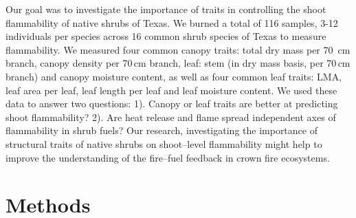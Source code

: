 \documentclass{bmcart}
\begin{document}
Our goal was to investigate the importance of traits in controlling the shoot flammability of native shrubs of Texas. 
We burned a total of 116 samples, 3-12 individuals per species across 16 common shrub species of Texas to measure flammability. We measured four common canopy traits: total dry mass per 70 \,cm branch, canopy density per 70\,cm branch,  leaf: stem (in dry mass basis, per 70\,cm branch) and canopy moisture content, as well as four common leaf traits: LMA, leaf area per leaf, leaf length per leaf and leaf moisture content. We used these data to answer two questions: 1). Canopy or leaf traits are better at predicting shoot flammability? 2). Are heat release and flame spread independent axes of flammability in shrub fuels? Our research, investigating the importance of structural traits of native shrubs on shoot--level flammability might help to improve the understanding of the fire--fuel feedback in crown fire ecosystems.

\section*{Methods}
\end{document}
